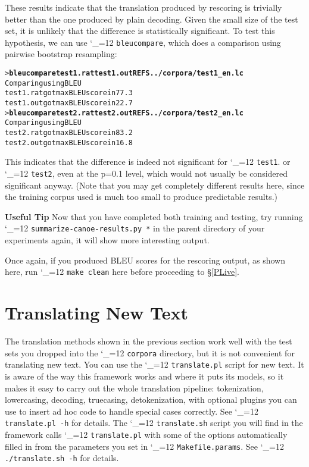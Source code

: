\documentclass[11pt,letterpaper]{article}
\def\code{\begingroup\catcode`\_=12 \codex}
\newcommand{\codex}[1]{\texttt{#1}\endgroup}
\newcommand{\tip}{\textbf{Useful Tip \large{\ding{43}} }}
\newcommand{\margintip}{\marginpar[{\textbf{Tip \large{\ding{43}}}}]{\textbf{\reflectbox{\large{\ding{43}}} Tip}}}
\newcommand{\tipend}{\textbf{ \reflectbox{\large{\ding{43}}}}}
\begin{document}
These results indicate that the translation produced by rescoring is trivially better
than the one produced by plain decoding. Given the small size of the test set,
it is unlikely that the difference is statistically significant. To test
this hypothesis, we can use \code{bleucompare}, which does a comparison using
pairwise bootstrap resampling:
\begin{small}
\begin{alltt}
   > \textbf{bleucompare test1.rat test1.out REFS ../corpora/test1_en.lc}
   Comparing using BLEU
   test1.rat got max BLEU score in 77.3% of samples
   test1.out got max BLEU score in 22.7% of samples
   > \textbf{bleucompare test2.rat test2.out REFS ../corpora/test2_en.lc}
   Comparing using BLEU
   test2.rat got max BLEU score in 83.2% of samples
   test2.out got max BLEU score in 16.8% of samples
\end{alltt}
\end{small}
This indicates that the difference is indeed not significant for \code{test1}.
or \code{test2}, even at the p=0.1 level, which would not
usually be considered significant anyway.  (Note that you may get completely
different results here, since the training corpus used is much too small to
produce predictable results.)

\tip \margintip Now that you have completed both training and testing, try
running \code{summarize-canoe-results.py *} in the parent directory of your
experiments again, it will show more interesting output.\tipend

Once again, if you produced BLEU scores for the rescoring output, as shown
here, run \code{make clean} here before proceeding to \S\ref{PLive}.

\section{Translating New Text} \label{NewText}

The translation methods shown in the previous section work well with the test
sets you dropped into the \code{corpora} directory, but it is not convenient for
translating new text.  You can use the \code{translate.pl} script for new text.
It is aware of the way this framework works and where it puts its models, so it
makes it easy to carry out the whole translation pipeline: tokenization,
lowercasing, decoding, truecasing, detokenization, with optional plugins you
can use to insert ad hoc code to handle special cases correctly.  See
\code{translate.pl -h} for details.  The \code{translate.sh} script you will
find in the framework calls \code{translate.pl} with some of the options
automatically filled in from the parameters you set in \code{Makefile.params}.
See \code{./translate.sh -h} for details.
\end{document}
